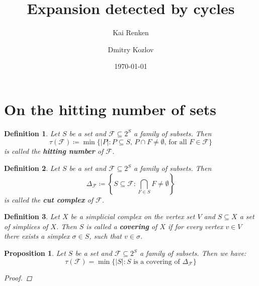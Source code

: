 \documentclass{article}
\title{Expansion detected by cycles}
\author{Kai Renken \and Dmitry Kozlov}
\date{\today}
\newtheorem{defi}{Definition}[section]
\newtheorem{prop}{Proposition}[section]
\begin{document}
\maketitle


\begin{abstract}

\end{abstract}

\section{On the hitting number of sets}

\begin{defi}
Let $S$ be a set and $\mathcal{F}\subseteq 2^S$ a family of subsets. Then
\[
\tau(\mathcal{F})\coloneqq\min\{|P|:P\subseteq S\text{, }P\cap F\neq\emptyset\text{, for all }F\in\mathcal{F}\}
\]
is called the \textbf{hitting number} of $\mathcal{F}$.
\end{defi}

\begin{defi}
Let $S$ be a set and $\mathcal{F}\subseteq 2^S$ a family of subsets. Then
\[
\Delta_{\mathcal{F}}\coloneqq\left\{S\subseteq\mathcal{F}:\bigcap\limits_{F\in S}F\neq\emptyset\right\}
\]
is called the \textbf{cut complex} of $\mathcal{F}$.
\end{defi}

\begin{defi}
Let $X$ be a simplicial complex on the vertex set $V$ and $S\subseteq X$ a set of simplices of $X$. Then $S$ is called a \textbf{covering} of $X$ if for every vertex $v\in V$ there exists a simplex $\sigma\in S$, such that $v\in\sigma$.
\end{defi}

\begin{prop}
Let $S$ be a set and $\mathcal{F}\subseteq 2^S$ a family of subsets. Then we have:
\[
\tau(\mathcal{F})=\min\{|S|:S\text{ is a covering of }\Delta_{\mathcal{F}}\}
\]
\begin{proof}

\end{proof}
\end{prop}

\begin{thebibliography}{9}

\end{thebibliography}
\end{document}
